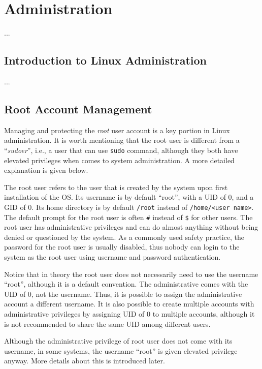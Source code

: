 \chapter{Administration} \label{ch:administration}
...

\section{Introduction to Linux Administration}
...


\section{Root Account Management}

Managing and protecting the \textit{root} user account is a key portion in Linux administration. It is worth mentioning that the root user is different from a ``\textit{sudoer}'', i.e., a user that can use \verb|sudo| command, although they both have elevated privileges when comes to system administration. A more detailed explanation is given below.

The root user refers to the user that is created by the system upon first installation of the OS. Its username is by default ``root'', with a UID of 0, and a GID of 0. Its home directory is by default \verb|/root| instead of \verb|/home/<user name>|. The default prompt for the root user is often \verb|#| instead of \verb|$| for other users. The root user has administrative privileges and can do almost anything without being denied or questioned by the system. As a commonly used safety practice, the password for the root user is usually disabled, thus nobody can login to the system as the root user using username and password authentication.

Notice that in theory the root user does not necessarily need to use the username ``root'', although it is a default convention. The administrative  comes with the UID of 0, not the username. Thus, it is possible to assign the administrative account a different username. It is also possible to create multiple accounts with administrative privileges by assigning UID of 0 to multiple accounts, although it is not recommended to share the same UID among different users.

Although the administrative privilege of root user does not come with its username, in some systems, the username ``root'' is given elevated privilege anyway. More details about this is introduced later.


